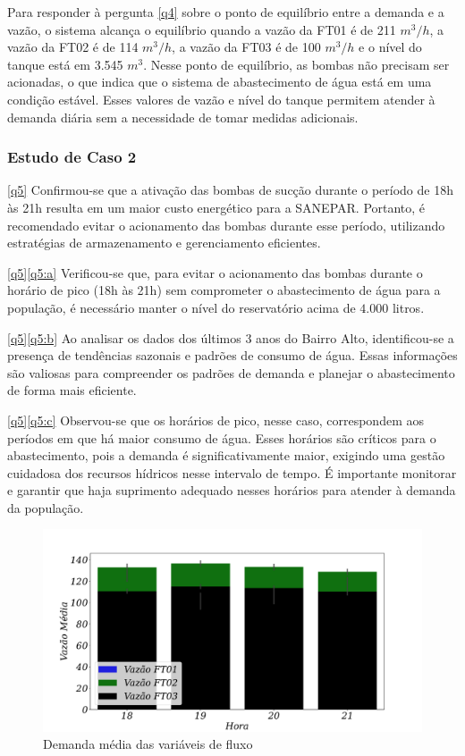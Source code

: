 Para responder à pergunta \ref{q4} sobre o ponto de equilíbrio entre a demanda e a vazão, o sistema alcança o equilíbrio quando a vazão da FT01 é de 211 $m^3/h$, a vazão da FT02 é de 114 $m^3/h$, a vazão da FT03 é de 100 $m^3/h$ e o nível do tanque está em 3.545 $m^3$. Nesse ponto de equilíbrio, as bombas não precisam ser acionadas, o que indica que o sistema de abastecimento de água está em uma condição estável. Esses valores de vazão e nível do tanque permitem atender à demanda diária sem a necessidade de tomar medidas adicionais.


\subsubsection{Estudo de Caso 2}

\eqref{q5} Confirmou-se que a ativação das bombas de sucção durante o período de 18h às 21h resulta em um maior custo energético para a SANEPAR. Portanto, é recomendado evitar o acionamento das bombas durante esse período, utilizando estratégias de armazenamento e gerenciamento eficientes.

\eqref{q5}\ref{q5:a} Verificou-se que, para evitar o acionamento das bombas durante o horário de pico (18h às 21h) sem comprometer o abastecimento de água para a população, é necessário manter o nível do reservatório acima de $4.000$ litros.

\eqref{q5}\ref{q5:b} Ao analisar os dados dos últimos 3 anos do Bairro Alto, identificou-se a presença de tendências sazonais e padrões de consumo de água. Essas informações são valiosas para compreender os padrões de demanda e planejar o abastecimento de forma mais eficiente.

\eqref{q5}\ref{q5:c} Observou-se que os horários de pico, nesse caso, correspondem aos períodos em que há maior consumo de água. Esses horários são críticos para o abastecimento, pois a demanda é significativamente maior, exigindo uma gestão cuidadosa dos recursos hídricos nesse intervalo de tempo. É importante monitorar e garantir que haja suprimento adequado nesses horários para atender à demanda da população.



\begin{figure}[H]
	\centering
	\caption{Demanda média das variáveis de fluxo}
	\includegraphics[width=0.9\linewidth]{Resultados/Figuras/grafico-barras-demanda}
	
	\label{fig:grafico-barras-demanda}
	
\end{figure}

